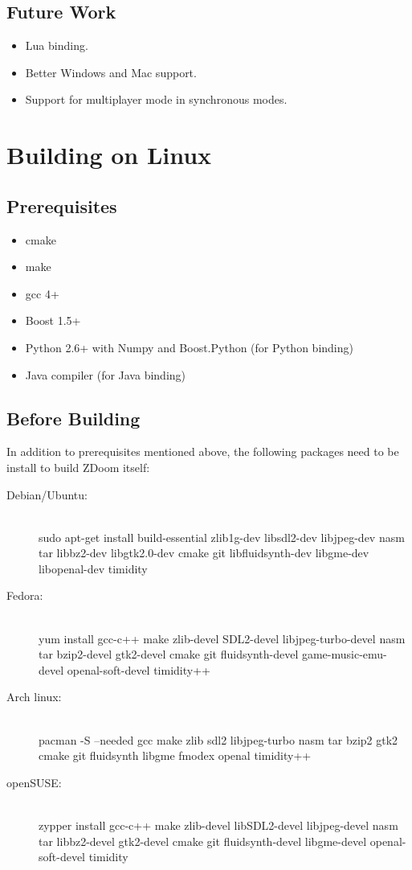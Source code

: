 \documentclass[english,bachelor,a4paper,twoside]{ppfcmthesis}
\begin{document}
\section{Future Work}
	\begin{itemize}
		\item Lua binding.
		\item Better Windows and Mac support.
		\item Support for multiplayer mode in synchronous modes.
	\end{itemize}


{\raggedright\sloppy\small}

\cleardoublepage\appendix%
%
\chapter{Building on Linux}
\section{Prerequisites}
\begin{itemize}
\item cmake
\item make
\item gcc 4+
\item Boost 1.5+
\item Python 2.6+ with Numpy and Boost.Python (for Python binding)
\item Java compiler (for Java binding)
\end{itemize}
\section{Before Building}
	In addition to prerequisites mentioned above, the following packages need to be install to build ZDoom itself:
	\begin{description}
		\item[Debian/Ubuntu:] \hfill \\
		sudo apt-get install build-essential zlib1g-dev libsdl2-dev libjpeg-dev nasm tar libbz2-dev libgtk2.0-dev cmake git libfluidsynth-dev libgme-dev libopenal-dev timidity
		\item[Fedora:] \hfill \\
		yum install gcc-c++ make zlib-devel SDL2-devel libjpeg-turbo-devel nasm tar bzip2-devel gtk2-devel cmake git fluidsynth-devel game-music-emu-devel	openal-soft-devel timidity++
		\item[Arch linux:] \hfill \\
		pacman -S --needed gcc make zlib sdl2 libjpeg-turbo nasm tar bzip2 gtk2 cmake git fluidsynth libgme fmodex openal timidity++
		\item[openSUSE:] \hfill \\
		zypper install gcc-c++ make zlib-devel libSDL2-devel libjpeg-devel nasm tar libbz2-devel gtk2-devel cmake git fluidsynth-devel libgme-devel openal-soft-devel timidity
	\end{description}
\end{document}
